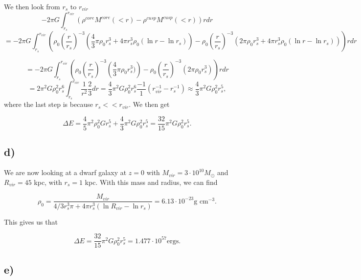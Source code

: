 \documentclass[a4paper,norsk, 10pt]{article}
\begin{document}
We then look from $r_s$ to $r_{vir}$
\begin{equation}
-2\pi G \int_{r_s}^{r_{vir}} \left(\rho^{core}M^{core}(<r) - \rho^{cusp}M^{cusp}(<r)\right) r dr 
\end{equation}
\begin{equation}
= -2\pi G \int_{r_s}^{r_{vir}} \left(\rho_0\left(\dfrac{r}{r_s}\right)^{-3}\left( \dfrac{4}{3}\pi \rho_0 r_s^3 + 4\pi r_s^3 \rho_0 (\ln r - \ln r_s)\right) -  \rho_0\left(\dfrac{r}{r_s}\right)^{-3}\left(2\pi  \rho_0 r_s^3 +  4\pi r_s^3 \rho_0 (\ln r - \ln r_s)\right) \right)r dr 
\end{equation}

\begin{equation}
= -2\pi G \int_{r_s}^{r_{vir}} \left(\rho_0\left(\dfrac{r}{r_s}\right)^{-3}\left( \dfrac{4}{3}\pi \rho_0 r_s^3)\right) -  \rho_0\left(\dfrac{r}{r_s}\right)^{-3}\left(2\pi \rho_0 r_s^3 \right) \right)r dr
\end{equation}
\begin{equation}
= 2\pi^2 G \rho_0^2 r_s^6 \int_{r_s}^{r_{vir}} \frac{1}{r^2} \frac{2}{3} dr = \frac{4}{3}\pi^2 G \rho_0^2 r_s^6 \frac{-1}{1}\left(r_{vir}^{-1} - r_s^{-1}\right) \approx \frac{4}{3}\pi^2 G \rho_0^2 r_s^5,
\end{equation}
where the last step is because $r_s << r_{vir}$. We then get

\begin{equation}
\Delta E = \frac{4}{5}\pi^2 \rho_0^2 G r_s^5 + \frac{4}{3}\pi^2 G \rho_0^2 r_s^5 = \frac{32}{15}\pi^2 G \rho_0^2 r_s^5.
\end{equation}

\subsection{d)}
We are now looking at a dwarf galaxy at $z=0$ with $M_{vir} = 3\cdot10^{10}M_{\odot}$ and $R_{vir} = 45$ kpc, with $r_s = 1$ kpc. With this mass and radius, we can find

\begin{equation}
\rho_0 = \dfrac{M_{vir}}{4/3 r_{s}^3 \pi + 4\pi r_s^3(\ln R_{vir} - \ln r_s)} = 6.13\cdot10^{-23} \text{g cm}^{-3}.
\end{equation}

This gives us that

\begin{equation}
\Delta E = \frac{32}{15}\pi^2 G \rho_0^2 r_s^5 = 1.477\cdot 10^{57} \text{ergs}.
\end{equation}

\subsection{e)}
\end{document}
